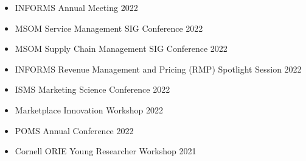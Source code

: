 \documentclass[margin,line]{resume}
\begin{document}
\begin{resume}
\begin{itemize}[topsep=-5mm, leftmargin=0mm, itemsep=0pt, parsep=0pt]
    \item [] INFORMS Annual Meeting \hfill 2022
    \item [] MSOM Service Management SIG Conference \hfill 2022
    \item [] MSOM Supply Chain Management SIG Conference \hfill 2022
    \item [] INFORMS Revenue Management and Pricing (RMP) Spotlight Session \hfill 2022
    \item [] ISMS Marketing Science Conference \hfill 2022
    \item [] Marketplace Innovation Workshop \hfill 2022
    \item [] POMS Annual Conference \hfill 2022
    \item [] Cornell ORIE Young Researcher Workshop \hfill 2021
\end{itemize}




\end{resume}
\end{document}

